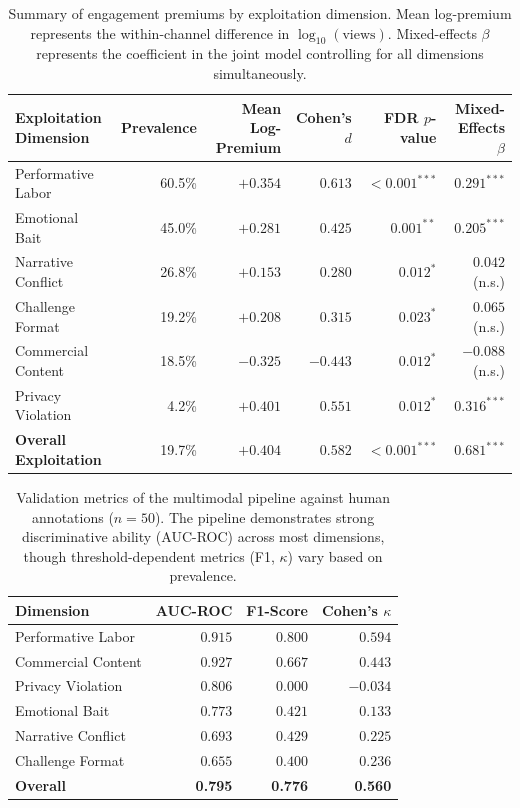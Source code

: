 \begin{table}[t]
\centering
\begin{tabular}{lrrrrr}
\toprule
\textbf{Exploitation Dimension} & \textbf{Prevalence} & \textbf{Mean Log-Premium} & \textbf{Cohen's $d$} & \textbf{FDR $p$-value} & \textbf{Mixed-Effects $\beta$} \\
\midrule
Performative Labor & 60.5\% & $+0.354$ & $0.613$ & $<0.001^{***}$ & $0.291^{***}$ \\
Emotional Bait & 45.0\% & $+0.281$ & $0.425$ & $0.001^{**}$ & $0.205^{***}$ \\
Narrative Conflict & 26.8\% & $+0.153$ & $0.280$ & $0.012^{*}$ & $0.042$ (n.s.) \\
Challenge Format & 19.2\% & $+0.208$ & $0.315$ & $0.023^{*}$ & $0.065$ (n.s.) \\
Commercial Content & 18.5\% & $-0.325$ & $-0.443$ & $0.012^{*}$ & $-0.088$ (n.s.) \\
Privacy Violation & 4.2\% & $+0.401$ & $0.551$ & $0.012^{*}$ & $0.316^{***}$ \\
\midrule
\textbf{Overall Exploitation} & 19.7\% & $+0.404$ & $0.582$ & $<0.001^{***}$ & $0.681^{***}$ \\
\bottomrule
\end{tabular}
\caption{Summary of engagement premiums by exploitation dimension. Mean log-premium represents the within-channel difference in $\log_{10}(\text{views})$. Mixed-effects $\beta$ represents the coefficient in the joint model controlling for all dimensions simultaneously.}
\label{tab:main_results}
\end{table}

\begin{table}[t]
\centering
\begin{tabular}{lrrr}
\toprule
\textbf{Dimension} & \textbf{AUC-ROC} & \textbf{F1-Score} & \textbf{Cohen's $\kappa$} \\
\midrule
Performative Labor & $0.915$ & $0.800$ & $0.594$ \\
Commercial Content & $0.927$ & $0.667$ & $0.443$ \\
Privacy Violation & $0.806$ & $0.000$ & $-0.034$ \\
Emotional Bait & $0.773$ & $0.421$ & $0.133$ \\
Narrative Conflict & $0.693$ & $0.429$ & $0.225$ \\
Challenge Format & $0.655$ & $0.400$ & $0.236$ \\
\midrule
\textbf{Overall} & \textbf{0.795} & \textbf{0.776} & \textbf{0.560} \\
\bottomrule
\end{tabular}
\caption{Validation metrics of the multimodal pipeline against human annotations ($n=50$). The pipeline demonstrates strong discriminative ability (AUC-ROC) across most dimensions, though threshold-dependent metrics (F1, $\kappa$) vary based on prevalence.}
\label{tab:validation}
\end{table}
